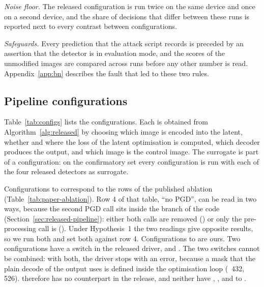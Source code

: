 \emph{Noise floor.} The released configuration is run twice on the same device and once on a
second device, and the share of decisions that differ between these runs is reported next to every
contrast between configurations. 

\emph{Safeguards.} Every prediction that the attack script records is preceded by an assertion
that the detector is in evaluation mode, and the scores of the unmodified images are compared
across runs before any other number is read. Appendix~\ref{app:bn} describes the fault that led to
these two rules.

\subsection{Pipeline configurations}
\label{sec:attacks}

Table~\ref{tab:configs} lists the configurations. Each is obtained from
Algorithm~\ref{alg:released} by choosing which image is encoded into the latent, whether and where
the loss of the latent optimisation is computed, which decoder produces the output, and which image
is the control image. The surrogate is part of a configuration: on the confirmatory set every
configuration is run with each of the four released detectors as surrogate.

Configurations  to  correspond to the rows of the published ablation
(Table~\ref{tab:paper-ablation}). Row 4 of that table, ``no PGD'', can be read in two ways, because
the second PGD call sits inside the \CVAE branch of the code
(Section~\ref{sec:released-pipeline}): either both calls are removed () or only the
pre-processing call is (). Under Hypothesis~1 the two readings give opposite results, so we
run both and set both against row 4. Configurations  to  are ours. Two
configurations have a switch in the released driver,  and . The two switches
cannot be combined: with both, the driver stops with an error, because a mask that the plain
decode of the output uses is defined inside the optimisation loop (~432, 526). 
therefore has no counterpart in the release, and neither have , ,  and
 to .

